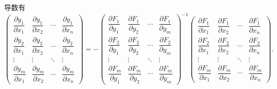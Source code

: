 导数有
\[
\begin{pmatrix}
	\dfrac{\partial y_1}{\partial x_1}&
	\dfrac{\partial y_1}{\partial x_2}&\cdots&
	\dfrac{\partial y_1}{\partial x_n}\\
	\dfrac{\partial y_2}{\partial x_1}&
	\dfrac{\partial y_2}{\partial x_2}&\cdots&
	\dfrac{\partial y_2}{\partial x_n}\\
	\vdots&\vdots&\ddots&\vdots\\
	\dfrac{\partial y_m}{\partial x_1}&
	\dfrac{\partial y_m}{\partial x_2}&\cdots&
	\dfrac{\partial y_m}{\partial x_n}
\end{pmatrix}
=
-
\begin{pmatrix}
	\dfrac{\partial F_1}{\partial y_1}&
	\dfrac{\partial F_1}{\partial y_2}&\cdots&
	\dfrac{\partial F_1}{\partial y_m}\\
	\dfrac{\partial F_2}{\partial y_1}&
	\dfrac{\partial F_2}{\partial y_2}&\cdots&
	\dfrac{\partial F_2}{\partial y_m}\\
	\vdots&\vdots&\ddots&\vdots\\
	\dfrac{\partial F_m}{\partial y_1}&
	\dfrac{\partial F_m}{\partial y_2}&\cdots&
	\dfrac{\partial F_m}{\partial y_m}
\end{pmatrix}^{-1}
\begin{pmatrix}
	\dfrac{\partial F_1}{\partial x_1}&
	\dfrac{\partial F_1}{\partial x_2}&\cdots&
	\dfrac{\partial F_1}{\partial x_n}\\
	\dfrac{\partial F_2}{\partial x_1}&
	\dfrac{\partial F_2}{\partial x_2}&\cdots&
	\dfrac{\partial F_2}{\partial x_n}\\
	\vdots&\vdots&\ddots&\vdots\\
	\dfrac{\partial F_m}{\partial x_1}&
	\dfrac{\partial F_m}{\partial x_2}&\cdots&
	\dfrac{\partial F_m}{\partial x_n}
\end{pmatrix}.
\]
